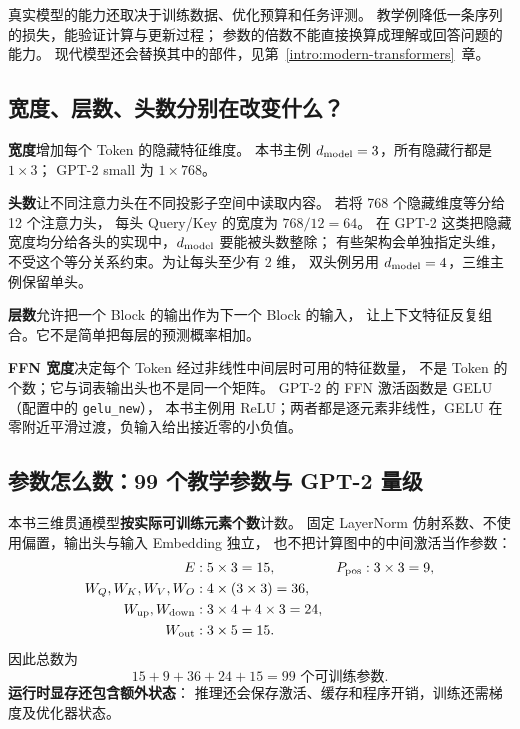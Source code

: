 真实模型的能力还取决于训练数据、优化预算和任务评测。
教学例降低一条序列的损失，能验证计算与更新过程；
参数的倍数不能直接换算成理解或回答问题的能力。
现代模型还会替换其中的部件，见第~\ref*{intro:modern-transformers}~章。

\subsection{宽度、层数、头数分别在改变什么？}

\textbf{宽度}增加每个 Token 的隐藏特征维度。
本书主例 $d_{\rm model}=3$，所有隐藏行都是 $1\times3$；
GPT-2 small 为 $1\times768$。

\textbf{头数}让不同注意力头在不同投影子空间中读取内容。
若将 768 个隐藏维度等分给 12 个注意力头，
每头 Query/Key 的宽度为 $768/12=64$。
在 GPT-2 这类把隐藏宽度均分给各头的实现中，$d_{\rm model}$ 要能被头数整除；
有些架构会单独指定头维，不受这个等分关系约束。为让每头至少有 $2$ 维，
双头例另用 $d_{\rm model}=4$，三维主例保留单头。

\textbf{层数}允许把一个 Block 的输出作为下一个 Block 的输入，
让上下文特征反复组合。它不是简单把每层的预测概率相加。

\textbf{FFN 宽度}决定每个 Token 经过非线性中间层时可用的特征数量，
不是 Token 的个数；它与词表输出头也不是同一个矩阵。
GPT-2 的 FFN 激活函数是 GELU（配置中的 \texttt{gelu\_new}），
本书主例用 ReLU；两者都是逐元素非线性，GELU 在零附近平滑过渡，负输入给出接近零的小负值。

\subsection{参数怎么数：99 个教学参数与 GPT-2 量级}

本书三维贯通模型\textbf{按实际可训练元素个数}计数。
固定 LayerNorm 仿射系数、不使用偏置，输出头与输入 Embedding 独立，
也不把计算图中的中间激活当作参数：
\[
\begin{aligned}
E &: 5\times3=15, & P_{\rm pos} &:3\times3=9,\\
W_Q,W_K,W_V,W_O &:4\times(3\times3)=36,\\
W_{\rm up},W_{\rm down} &:3\times4+4\times3=24,\\
W_{\rm out} &:3\times5=15.
\end{aligned}
\]
因此总数为
\begin{equation}
\boxed{15+9+36+24+15=99\text{ 个可训练参数}.}
\label{eq:toy-99-parameters}
\end{equation}
\textbf{运行时显存还包含额外状态}：
推理还会保存激活、缓存和程序开销，训练还需梯度及优化器状态。


